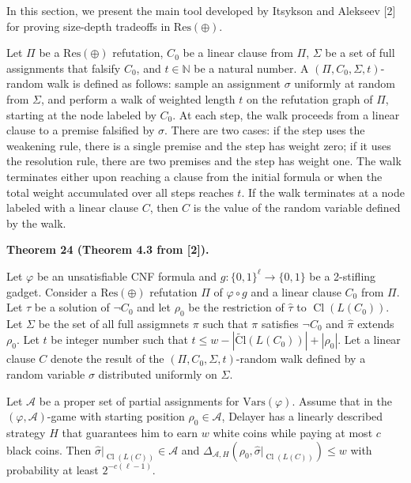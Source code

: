 In this section, we present the main tool developed by Itsykson and Alekseev [2] for proving size-depth tradeoffs in $\mathrm{Res}(\oplus)$.\par



Let $\Pi$ be a $\mathrm{Res}(\oplus)$ refutation, $C_{0}$ be a linear clause from $\Pi$, $\Sigma$ be a set of full assignments that falsify $C_{0}$, and
$t\in\mathbb{N}$ be a natural number.
A $(\Pi,C_{0},\Sigma,t)$-random walk is defined as follows: sample an assignment $\sigma$ uniformly at random from $\Sigma$,
and perform a walk of weighted length $t$ on the refutation graph of $\Pi$, starting at the node labeled by $C_{0}$.
At each step, the walk proceeds from a linear clause to a premise falsified by $\sigma$.
There are two cases: if the step uses the weakening rule, there is a single premise and the step has weight zero;
if it uses the resolution rule, there are two premises and the step has weight one.
The walk terminates either upon reaching a clause from the initial formula or when the total weight accumulated over all steps reaches $t$.
If the walk terminates at a node labeled with a linear clause $C$, then $C$ is the value of the random variable defined by the walk.\par



\par\medskip\noindent\textbf{
Theorem 24 (Theorem 4.3 from [2]).
}\par



Let $\varphi$ be an unsatisfiable CNF formula and $g\colon\{0,1\}^{\ell}\to\{0,1\}$ be a 2-stifling gadget.
Consider a $\mathrm{Res}(\oplus)$ refutation $\Pi$ of $\varphi\circ g$ and a linear clause $C_{0}$ from $\Pi$.
Let $\tau$ be a solution of $\lnot C_{0}$ and let $\rho_{0}$ be the restriction of $\hat{\tau}$ to $\operatorname{Cl}(L(C_{0}))$.
Let $\Sigma$ be the set of all full assigmnets $\pi$ such that $\pi$ satisfies $\lnot C_{0}$ and $\hat{\pi}$ extends $\rho_{0}$.
Let $t$ be integer number such that $t\leq w-|\operatorname{\widetilde{Cl}}(L(C_{0}))|+|\rho_{0}|$. Let a linear clause $C$ denote the result of the $(\Pi,C_{0},\Sigma,t)$-random walk defined by a random variable $\sigma$ distributed uniformly on $\Sigma$.\par




Let $\mathcal{A}$ be a proper set of partial assignments for $\mathrm{Vars}(\varphi)$.
Assume that in the $(\varphi,\mathcal{A})$-game with starting position $\rho_{0}\in\mathcal{A}$,
Delayer has a linearly described strategy $H$ that guarantees him to earn $w$ white coins while paying at most $c$ black coins.
Then $\hat{\sigma}|_{\operatorname{Cl}(L(C))}\in\mathcal{A}$ and
$\Delta_{\mathcal{A},H}(\rho_{0},\hat{\sigma}|_{\operatorname{Cl}(L(C))})\leq w$ with probability at least $2^{-c(\ell-1)}$.\par




